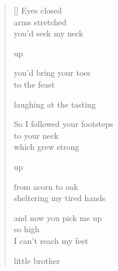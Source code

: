 \documentclass[12pt,a4paper]{article}
\begin{document}

\newpage

\poemtitle{}

\settowidth{\versewidth}{So I followed your footsteps}

\bigskip

\begin{verse}[\versewidth]
  Eyes closed \\
  arms stretched \\
  you'd seek my neck

  up

  you'd bring your toes \\
  to the feast

  laughing at the tasting

  So I followed your footsteps \\
  to your neck \\
  which grew strong

  up

  from acorn to oak \\
  sheltering my tired hands

  and now you pick me up \\
  so high \\
  I can't reach my feet

  little brother
\end{verse}



\newpage

\poemtitle{}

\settowidth{\versewidth}{like the summer storm knocks}

\bigskip
\end{document}
